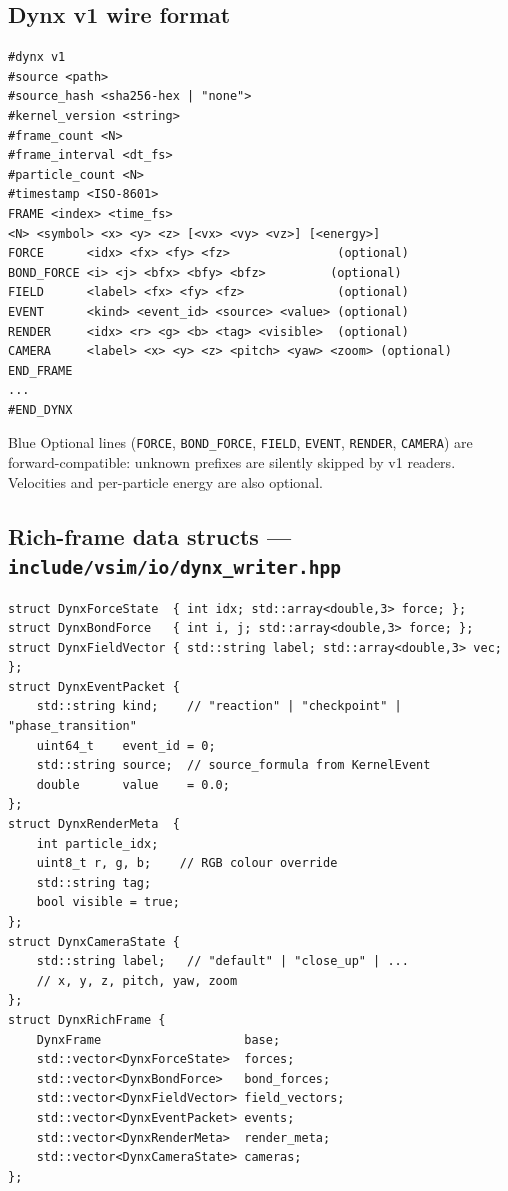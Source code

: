 ﻿\documentclass[11pt,a4paper]{article}
\begin{document}
\subsection*{Dynx v1 wire format}

\begin{lstlisting}
#dynx v1
#source <path>
#source_hash <sha256-hex | "none">
#kernel_version <string>
#frame_count <N>
#frame_interval <dt_fs>
#particle_count <N>
#timestamp <ISO-8601>
FRAME <index> <time_fs>
<N> <symbol> <x> <y> <z> [<vx> <vy> <vz>] [<energy>]
FORCE      <idx> <fx> <fy> <fz>               (optional)
BOND_FORCE <i> <j> <bfx> <bfy> <bfz>         (optional)
FIELD      <label> <fx> <fy> <fz>             (optional)
EVENT      <kind> <event_id> <source> <value> (optional)
RENDER     <idx> <r> <g> <b> <tag> <visible>  (optional)
CAMERA     <label> <x> <y> <z> <pitch> <yaw> <zoom> (optional)
END_FRAME
...
#END_DYNX
\end{lstlisting}

\begin{notebox}{Blue}
Optional lines (\texttt{FORCE}, \texttt{BOND\_FORCE}, \texttt{FIELD}, \texttt{EVENT},
\texttt{RENDER}, \texttt{CAMERA}) are forward-compatible: unknown prefixes are silently
skipped by v1 readers.  Velocities and per-particle energy are also optional.
\end{notebox}

\subsection*{Rich-frame data structs --- \texttt{include/vsim/io/dynx\_writer.hpp}}

\begin{lstlisting}
struct DynxForceState  { int idx; std::array<double,3> force; };
struct DynxBondForce   { int i, j; std::array<double,3> force; };
struct DynxFieldVector { std::string label; std::array<double,3> vec; };
struct DynxEventPacket {
    std::string kind;    // "reaction" | "checkpoint" | "phase_transition"
    uint64_t    event_id = 0;
    std::string source;  // source_formula from KernelEvent
    double      value    = 0.0;
};
struct DynxRenderMeta  {
    int particle_idx;
    uint8_t r, g, b;    // RGB colour override
    std::string tag;
    bool visible = true;
};
struct DynxCameraState {
    std::string label;   // "default" | "close_up" | ...
    // x, y, z, pitch, yaw, zoom
};
struct DynxRichFrame {
    DynxFrame                    base;
    std::vector<DynxForceState>  forces;
    std::vector<DynxBondForce>   bond_forces;
    std::vector<DynxFieldVector> field_vectors;
    std::vector<DynxEventPacket> events;
    std::vector<DynxRenderMeta>  render_meta;
    std::vector<DynxCameraState> cameras;
};
\end{lstlisting}
\end{document}
